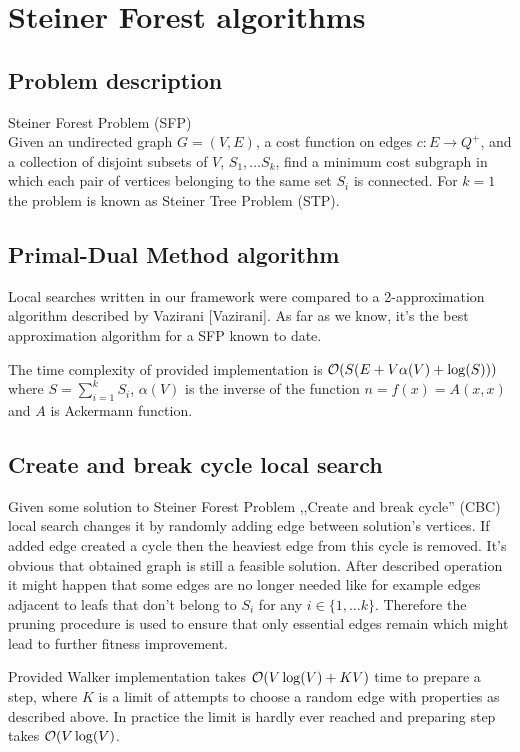 \chapter{Steiner Forest algorithms}

\section{Problem description}
Steiner Forest Problem (SFP)\\
Given an undirected graph $G = (V, E)$, a cost function on edges $c : E \rightarrow Q^+$, and a collection of disjoint subsets of $V$, $S_1, \dots S_k$, find a minimum cost subgraph in which each pair of vertices belonging to the same set $S_i$ is connected.
For $k = 1$ the problem is known as Steiner Tree Problem (STP).

\section{Primal-Dual Method algorithm}
Local searches written in our framework were compared to a 2-approximation algorithm described by Vazirani [Vazirani]. As far as we know, it's the best approximation algorithm for a SFP known to date.

The time complexity of provided implementation is $\mathcal{O}(S(E + V\alpha(V) + \log(S)))$ where $S = \sum_{i = 1}^{k}S_i$, $\alpha(V)$ is the inverse of the function $n = f(x) = A(x, x)$ and $A$ is Ackermann function.

\section{Create and break cycle local search}
Given some solution to Steiner Forest Problem ,,Create and break cycle'' (CBC) local search changes it by randomly adding edge between solution's vertices. If added edge created a cycle then the heaviest edge from this cycle is removed. It's obvious that obtained graph is still a feasible solution. After described operation it might happen that some edges are no longer needed like for example edges adjacent to leafs that don't belong to $S_i$ for any $i \in \{1, \dots k\}$. Therefore the pruning procedure is used to ensure that only essential edges remain which might lead to further fitness improvement.

Provided Walker implementation takes $\mathcal{O}(V\log(V) + KV)$ time to prepare a step, where $K$ is a limit of attempts to choose a random edge with properties as described above. In practice the limit is hardly ever reached and preparing step takes $\mathcal{O}(V\log(V)$.

